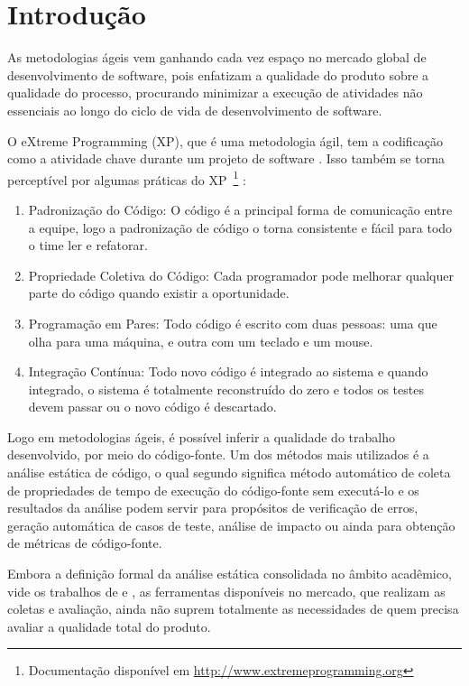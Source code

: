 \chapter{Introdução}

As metodologias ágeis vem ganhando cada vez espaço no mercado global 
de desenvolvimento de software, pois enfatizam a qualidade do produto 
sobre a qualidade do processo, procurando minimizar a execução 
de atividades não essenciais ao longo do ciclo de vida de 
desenvolvimento de software. 

O eXtreme Programming (XP), que é uma metodologia ágil, tem a codificação como a 
atividade chave durante um projeto de software \cite{beck1999}. Isso também se 
torna perceptível por algumas práticas do 
XP~\footnote{Documentação disponível em \url{http://www.extremeprogramming.org}}
 :

\begin{enumerate}
\item Padronização do Código: O código é a principal forma de comunicação entre 
a equipe, logo a padronização de código o torna consistente e fácil para todo o 
time ler e refatorar. 
\item Propriedade Coletiva do Código: Cada programador pode melhorar qualquer 
parte do código quando existir a oportunidade.
\item Programação em Pares: Todo código é escrito com duas pessoas: uma que olha 
para uma máquina, e outra com um teclado e um mouse.
\item Integração Contínua: Todo novo código é integrado ao sistema e quando 
integrado, o sistema é totalmente reconstruído do zero e todos os testes devem 
passar ou o novo código é descartado.

\end{enumerate} 


Logo em metodologias ágeis, é possível inferir a qualidade do trabalho 
desenvolvido, por meio do código-fonte. Um dos métodos mais utilizados é a 
análise estática de código, o qual segundo  
significa método automático de coleta de propriedades de tempo de execução do 
código-fonte sem executá-lo e os resultados da análise podem servir para 
propósitos de verificação de erros, geração automática de casos de teste, 
análise de impacto ou ainda para obtenção de métricas de código-fonte.

Embora a definição formal da análise estática consolidada no âmbito acadêmico, 
vide os trabalhos de \cite{Wichmann95} e \cite{Nielson:1999}, as ferramentas 
disponíveis no mercado, que realizam as coletas e avaliação, 
ainda não suprem totalmente as necessidades de quem precisa avaliar a 
qualidade total do produto.

